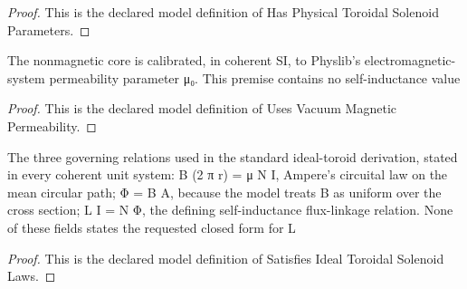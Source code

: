 \begin{proof}
  This is the declared model definition of Has Physical Toroidal Solenoid Parameters.
\end{proof}
\begin{definition}
  \label{def:physics:phyx-mini-0940:phyxminiproblems-problemphyxmini0940-usesvacuummagneticpermeability}
  The nonmagnetic core is calibrated, in coherent SI, to Physlib's electromagnetic-system permeability parameter μ₀. This premise contains no self-inductance value
\end{definition}
\begin{proof}
  This is the declared model definition of Uses Vacuum Magnetic Permeability.
\end{proof}
\begin{definition}
  \label{def:physics:phyx-mini-0940:phyxminiproblems-problemphyxmini0940-satisfiesidealtoroidalsolenoidlaws}
  The three governing relations used in the standard ideal-toroid derivation, stated in every coherent unit system: B (2 π r) = μ N I, Ampere's circuital law on the mean circular path; Φ = B A, because the model treats B as uniform over the cross section; L I = N Φ, the defining self-inductance flux-linkage relation. None of these fields states the requested closed form for L
\end{definition}
\begin{proof}
  This is the declared model definition of Satisfies Ideal Toroidal Solenoid Laws.
\end{proof}
